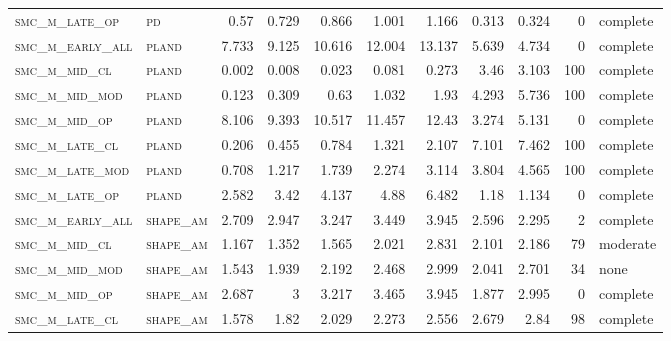 \begin{landscape}
\begin{center}
\begin{footnotesize}
\begin{longtable}{llrrrrr|rrr}
\textsc{smc\_m\_late\_op  } & \textsc{pd        }   & 0.57     & 0.729    & 0.866    & 1.001    & 1.166    & 0.313       & 0.324         & 0             & complete     \\
\textsc{smc\_m\_early\_all} & \textsc{pland     }   & 7.733    & 9.125    & 10.616   & 12.004   & 13.137   & 5.639       & 4.734         & 0             & complete     \\
\textsc{smc\_m\_mid\_cl   } & \textsc{pland     }   & 0.002    & 0.008    & 0.023    & 0.081    & 0.273    & 3.46        & 3.103         & 100           & complete \\
\textsc{smc\_m\_mid\_mod  } & \textsc{pland     }   & 0.123    & 0.309    & 0.63     & 1.032    & 1.93     & 4.293       & 5.736         & 100           & complete \\
\textsc{smc\_m\_mid\_op   } & \textsc{pland     }   & 8.106    & 9.393    & 10.517   & 11.457   & 12.43    & 3.274       & 5.131         & 0             & complete     \\
\textsc{smc\_m\_late\_cl  } & \textsc{pland     }   & 0.206    & 0.455    & 0.784    & 1.321    & 2.107    & 7.101       & 7.462         & 100           & complete \\
\textsc{smc\_m\_late\_mod } & \textsc{pland     }   & 0.708    & 1.217    & 1.739    & 2.274    & 3.114    & 3.804       & 4.565         & 100           & complete \\
\textsc{smc\_m\_late\_op  } & \textsc{pland     }   & 2.582    & 3.42     & 4.137    & 4.88     & 6.482    & 1.18        & 1.134         & 0             & complete     \\
\textsc{smc\_m\_early\_all} & \textsc{shape\_am }   & 2.709    & 2.947    & 3.247    & 3.449    & 3.945    & 2.596       & 2.295         & 2             & complete \\
\textsc{smc\_m\_mid\_cl   } & \textsc{shape\_am }   & 1.167    & 1.352    & 1.565    & 2.021    & 2.831    & 2.101       & 2.186         & 79            & moderate \\
\textsc{smc\_m\_mid\_mod  } & \textsc{shape\_am }   & 1.543    & 1.939    & 2.192    & 2.468    & 2.999    & 2.041       & 2.701         & 34            & none \\
\textsc{smc\_m\_mid\_op   } & \textsc{shape\_am }   & 2.687    & 3        & 3.217    & 3.465    & 3.945    & 1.877       & 2.995         & 0             & complete     \\
\textsc{smc\_m\_late\_cl  } & \textsc{shape\_am }   & 1.578    & 1.82     & 2.029    & 2.273    & 2.556    & 2.679       & 2.84          & 98            & complete \\

\end{longtable}
\end{footnotesize}
\end{center}
\end{landscape}
